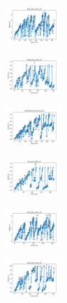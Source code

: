 \begin{figure}[H]
\begin{subfigure}
        \centering
        \includegraphics[width=0.234\textwidth]{img/ils/ecoli_set_const_10_589741062_time.png}
    \end{subfigure}
    \hfill
    \begin{subfigure}
        \centering
        \includegraphics[width=0.234\textwidth]{img/ils/rand_set_const_10_589741062_time.png}
    \end{subfigure}
    \hfill
    \begin{subfigure}
        \centering
        \includegraphics[width=0.234\textwidth]{img/ils/newthyroid_set_const_10_589741062_time.png}
    \end{subfigure}
    \hfill
    \begin{subfigure}
        \centering
        \includegraphics[width=0.234\textwidth]{img/ils/iris_set_const_10_277451237_time.png}
    \end{subfigure}
    \hfill
    \begin{subfigure}
        \centering
        \includegraphics[width=0.234\textwidth]{img/ils/ecoli_set_const_10_277451237_time.png}
    \end{subfigure}
    \hfill
    \begin{subfigure}
        \centering
        \includegraphics[width=0.234\textwidth]{img/ils/rand_set_const_10_277451237_time.png}

\end{subfigure}
\end{figure}
